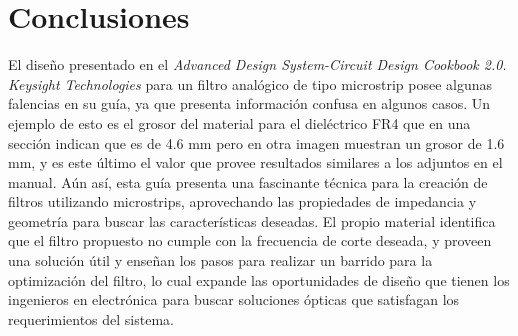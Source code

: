 \section{Conclusiones}

El diseño presentado en el \textit{Advanced Design System-Circuit Design Cookbook 2.0. Keysight Technologies} para un filtro analógico de tipo microstrip posee algunas falencias en su guía, ya que presenta información confusa en algunos casos. Un ejemplo de esto es el grosor del material para el dieléctrico FR4 que en una sección indican que es de 4.6 mm pero en otra imagen muestran un grosor de 1.6 mm, y es este último el valor que provee resultados similares a los adjuntos en el manual. Aún así, esta guía presenta una fascinante técnica para la creación de filtros utilizando microstrips, aprovechando las propiedades de impedancia y geometría para buscar las características deseadas. El propio material identifica que el filtro propuesto no cumple con la frecuencia de corte deseada, y proveen una solución útil y enseñan los pasos para realizar un barrido para la optimización del filtro, lo cual expande las oportunidades de diseño que tienen los ingenieros en electrónica para buscar soluciones ópticas que satisfagan los requerimientos del sistema.